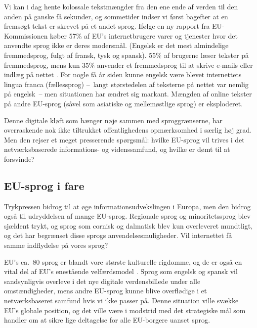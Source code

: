\begin{multicols}{2}
Vi kan i dag hente kolossale tekstm\ae ngder fra den ene ende af verden til den anden \mbox{p\aa} ganske \mbox{f\aa} sekunder, og sommetider indser vi f\o rst bagefter at en frems\o gt tekst er skrevet \mbox{p\aa} et andet sprog. If\o lge en ny rapport fra EU-Kommissionen k\o ber 57\% af EU's internetbrugere varer og tjenester hvor det anvendte sprog ikke er deres mo\-dersm\aa l. (Engelsk er det mest almindelige fremmedsprog, fulgt af fransk, tysk og spansk). 55\% af brugerne l\ae ser tekster \mbox{p\aa} fremmedsprog, mens kun 35\% anvender et fremmedsprog til at skrive e-mails eller indl\ae g \mbox{p\aa} nettet \cite{EC1}.  For nogle \mbox{f\aa} \aa r siden kunne engelsk v\ae re blevet internettets lingua franca (f\ae llessprog) --~langt st\o rstedelen af teksterne \mbox{p\aa} nettet var nemlig \mbox{p\aa} engelsk~--  men situationen har \ae ndret sig markant. M\ae ngden af online tekster \mbox{p\aa} andre EU-sprog (s\aa vel som asiatiske og mellem\o stlige sprog) er eksploderet.

Denne digitale kl\o ft som h\ae nger n\o je sammen med sproggr\ae nserne, har overraskende nok ikke tiltrukket offentlighedens opm\ae rksomhed i s\ae rlig h\o j grad. Men den rejser et meget presserende sp\o rgsm\aa l: hvilke EU-sprog vil trives i det netv\ae rksbaserede informations- og videnssamfund, og hvilke er d\o mt til at forsvinde?
  

\subsection{EU-sprog i fare}

 Trykpressen bidrog til at \o ge informationsudvekslingen i Europa, men den bidrog \mbox{ogs\aa} til udryddelsen af mange EU-sprog. Regionale sprog og minoritetssprog blev sj\ae ldent trykt, og sprog som cornisk og dalmatisk blev kun overleveret mundtligt, og det har begr\ae nset disse sprogs anvendelsesmuligheder. Vil internettet \mbox{f\aa} samme indflydelse \mbox{p\aa} vores sprog?


EU's ca.\ 80 sprog er blandt vore st\o rste kulturelle rigdomme, og de er \mbox{ogs\aa} en vital del af EU's enest\aa ende velf\ae rdsmodel \cite{EC2}.  Sprog som engelsk og spansk vil sandsynligvis overleve i det nye digitale verdensbillede under alle omst\ae ndigheder, mens andre EU-sprog kunne blive overfl\o dige i et netv\ae rksbaseret samfund hvis vi ikke passer \mbox{p\aa}. Denne situation ville sv\ae kke EU's globale position, og det ville v\ae re i modstrid med det strategiske m\aa l som handler om at sikre lige del\-tagelse for alle EU-borgere uanset sprog.


\end{multicols}

